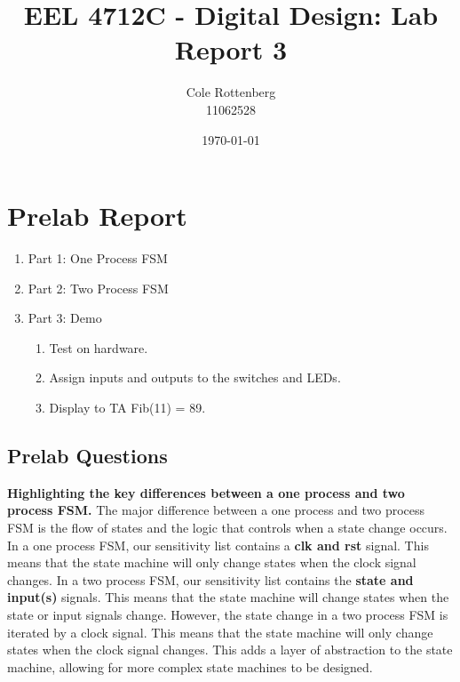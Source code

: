 \documentclass{article}
\title{EEL 4712C - Digital Design: Lab Report 3}
\author{Cole Rottenberg \\ 11062528}
\date{\today}
\begin{document}
\maketitle

\section*{Prelab Report}
\begin{enumerate}
  \item Part 1: One Process FSM
  \item Part 2: Two Process FSM
  \item Part 3: Demo
  \begin{enumerate}
    \item Test on hardware.
    \item Assign inputs and outputs to the switches and LEDs.
    \item Display to TA Fib(11) = 89.
  \end{enumerate}
\end{enumerate}
\subsection*{Prelab Questions}
\textbf{Highlighting the key differences between a one process and two process FSM.}
The major difference between a one process and two process FSM is the flow of states and the logic that controls when a state change occurs. In a one process FSM, our sensitivity list contains a \textbf{clk and rst} signal. This means that the state machine will only change states when the clock signal changes. In a two process FSM, our sensitivity list contains the \textbf{state and input(s)} signals. This means that the state machine will change states when the state or input signals change. However, the state change in a two process FSM is iterated by a clock signal. This means that the state machine will only change states when the clock signal changes. This adds a layer of abstraction to the state machine, allowing for more complex state machines to be designed.
\end{document}

